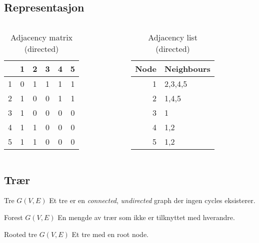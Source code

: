\subsection*{Representasjon}
\begin{frame}
\begin{center}
\end{center}
\vspace{-1cm}
\begin{columns}
    \begin{column}{0.48\textwidth}
 \begin{table}[]
\centering
\label{tab:adjmatexample}
\begin{tabular}{r|ccccc}
  & 1 & 2 & 3 & 4 & 5 \\ \hline
1 & 0  & 1  & 1  &  1 & 1  \\
2 & 1  & 0  & 0  &  1 & 1  \\
3 & 1  & 0  & 0  &  0 & 0  \\
4 & 1  & 1  & 0  & 0  & 0  \\
5 & 1  & 1  & 0  & 0  & 0 
\end{tabular}
\caption{Adjacency matrix (directed)}
\end{table}
 \end{column}
    \begin{column}{0.48\textwidth}
\begin{table}[]
\centering
\label{tab:adjlistexample}
\begin{tabular}{r|l}
Node & Neighbours \\ \hline
1   &  {2,3,4,5}          \\
2   &  {1,4,5}          \\
3   &  {1}          \\
4   &  {1,2}          \\
5   &  {1,2}         
\end{tabular}
\caption{Adjacency list (directed)}
\end{table}
 \end{column}
\end{columns}
\end{frame}

\subsection{Trær}
\begin{frame}
\begin{block}{Tre $G(V,E)$}
    Et tre er en \textit{connected}, \textit{undirected} graph der ingen cycles eksisterer.
    \end{block}
    \pause
\begin{block}{Forest $G(V,E)$}
    En mengde av trær som ikke er tilknyttet med hverandre.
    \end{block}
    \pause
\begin{block}{Rooted tre $G(V,E)$}
    Et tre med en root node.
    \end{block}
\end{frame}

